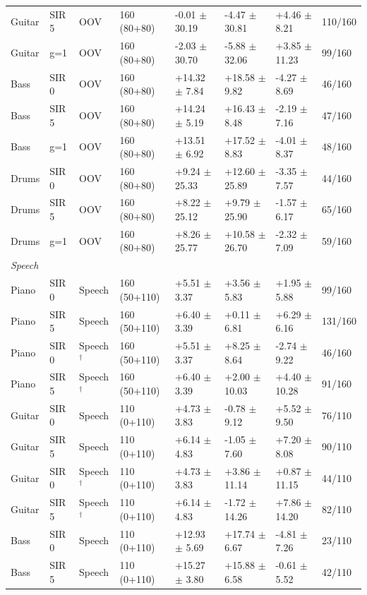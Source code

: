 \begin{tabular}{llllllll}
Guitar & SIR 5 & OOV & 160 (80+80) & -0.01 $\pm$ 30.19 & -4.47 $\pm$ 30.81 & +4.46 $\pm$ 8.21 & 110/160\\
Guitar & g=1 & OOV & 160 (80+80) & -2.03 $\pm$ 30.70 & -5.88 $\pm$ 32.06 & +3.85 $\pm$ 11.23 & 99/160\\
Bass & SIR 0 & OOV & 160 (80+80) & +14.32 $\pm$ 7.84 & +18.58 $\pm$ 9.82 & -4.27 $\pm$ 8.69 & 46/160\\
Bass & SIR 5 & OOV & 160 (80+80) & +14.24 $\pm$ 5.19 & +16.43 $\pm$ 8.48 & -2.19 $\pm$ 7.16 & 47/160\\
Bass & g=1 & OOV & 160 (80+80) & +13.51 $\pm$ 6.92 & +17.52 $\pm$ 8.83 & -4.01 $\pm$ 8.37 & 48/160\\
Drums & SIR 0 & OOV & 160 (80+80) & +9.24 $\pm$ 25.33 & +12.60 $\pm$ 25.89 & -3.35 $\pm$ 7.57 & 44/160\\
Drums & SIR 5 & OOV & 160 (80+80) & +8.22 $\pm$ 25.12 & +9.79 $\pm$ 25.90 & -1.57 $\pm$ 6.17 & 65/160\\
Drums & g=1 & OOV & 160 (80+80) & +8.26 $\pm$ 25.77 & +10.58 $\pm$ 26.70 & -2.32 $\pm$ 7.09 & 59/160\\
\midrule
\multicolumn{8}{l}{\emph{Speech}}\\
Piano & SIR 0 & Speech & 160 (50+110) & +5.51 $\pm$ 3.37 & +3.56 $\pm$ 5.83 & +1.95 $\pm$ 5.88 & 99/160\\
Piano & SIR 5 & Speech & 160 (50+110) & +6.40 $\pm$ 3.39 & +0.11 $\pm$ 6.81 & +6.29 $\pm$ 6.16 & 131/160\\
Piano & SIR 0 & Speech$^\dagger$ & 160 (50+110) & +5.51 $\pm$ 3.37 & +8.25 $\pm$ 8.64 & -2.74 $\pm$ 9.22 & 46/160\\
Piano & SIR 5 & Speech$^\dagger$ & 160 (50+110) & +6.40 $\pm$ 3.39 & +2.00 $\pm$ 10.03 & +4.40 $\pm$ 10.28 & 91/160\\
Guitar & SIR 0 & Speech & 110 (0+110) & +4.73 $\pm$ 3.83 & -0.78 $\pm$ 9.12 & +5.52 $\pm$ 9.50 & 76/110\\
Guitar & SIR 5 & Speech & 110 (0+110) & +6.14 $\pm$ 4.83 & -1.05 $\pm$ 7.60 & +7.20 $\pm$ 8.08 & 90/110\\
Guitar & SIR 0 & Speech$^\dagger$ & 110 (0+110) & +4.73 $\pm$ 3.83 & +3.86 $\pm$ 11.14 & +0.87 $\pm$ 11.15 & 44/110\\
Guitar & SIR 5 & Speech$^\dagger$ & 110 (0+110) & +6.14 $\pm$ 4.83 & -1.72 $\pm$ 14.26 & +7.86 $\pm$ 14.20 & 82/110\\
Bass & SIR 0 & Speech & 110 (0+110) & +12.93 $\pm$ 5.69 & +17.74 $\pm$ 6.67 & -4.81 $\pm$ 7.26 & 23/110\\
Bass & SIR 5 & Speech & 110 (0+110) & +15.27 $\pm$ 3.80 & +15.88 $\pm$ 6.58 & -0.61 $\pm$ 5.52 & 42/110\\

\end{tabular}
